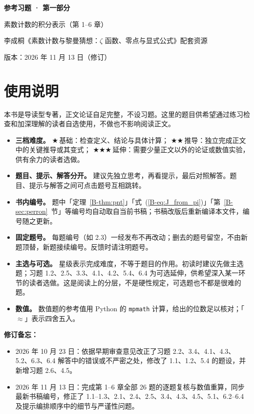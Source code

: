 \documentclass[11pt,a4paper]{article}
\newcommand{\bref}[1]{\ref*{B-#1}}
\newcommand{\lvI}{$\bigstar$\,基础}
\newcommand{\lvII}{$\bigstar\bigstar$\,推导}
\newcommand{\lvIII}{$\bigstar\bigstar\bigstar$\,延伸}
\newcommand{\versiondate}{2026 年 11 月 13 日（修订）}
\begin{document}
\begin{center}
{\LARGE\bfseries 参考习题 · 第一部分\par}
\vspace{0.6em}
{\large 素数计数的积分表示（第 1–6 章）\par}
\vspace{0.6em}
{\normalsize 李成桐《素数计数与黎曼猜想：$\zeta$ 函数、零点与显式公式》配套资源\par}
\vspace{0.3em}
{\small 版本：\versiondate\par}
\end{center}

\vspace{0.8em}
\section*{使用说明}

本书是导读型专著，正文论证自足完整，不设习题。这里的题目供希望通过练习检查和加深理解的读者自选使用，不做也不影响阅读正文。

\begin{itemize}
  \item \textbf{三档难度。}
    \lvI：检查定义、结论与具体计算；
    \lvII：独立完成正文中的关键推导或其变式；
    \lvIII：需要少量正文以外的论证或数值实验，供有余力的读者选做。
  \item \textbf{题目、提示、解答分开。}
    建议先独立思考，再看提示，最后对照解答。题目、提示与解答之间可点击题号互相跳转。
  \item \textbf{书内编号。}
    题中「定理~\bref{thm:pnt}」「式~(\bref{eq:J_from_pi})」「第~\bref{sec:perron}~节」等编号均自动取自当前书稿；书稿改版后重新编译本文件，编号随之更新。
  \item \textbf{固定题号。}
    每题编号（如 2.3）一经发布不再改动；删去的题号留空，不由新题顶替，新题接续编号。反馈时请注明题号。
  \item \textbf{主选与可选。}
    星级表示完成难度，不等于题目的作用。初读时建议先做主选题；习题 1.2、2.5、3.3、4.1、4.2、5.4、6.4 为可选延伸，供希望深入某一环节的读者选做。这是阅读上的分层，不是硬性规定，可选题也不都是很难的题。
  \item \textbf{数值。}
    数值题的参考值用 Python 的 \texttt{mpmath} 计算，给出的位数足以核对；「$\approx$」表示四舍五入。
\end{itemize}

\noindent\textbf{修订备忘：}
\begin{itemize}
  \item 2026 年 10 月 23 日：依据早期审查意见改正了习题 2.2、3.4、4.1、4.3、5.2、6.3、6.4 解答中的错误或不严密之处，修改了 1.1、1.2、5.4 的题设，并新增习题 2.6、4.5。
  \item 2026 年 11 月 13 日：完成第 1–6 章全部 26 题的逐题复核与数值重算，同步最新书稿编号，修正了 1.1–1.3、2.1、2.4、2.5、3.4、4.3、4.5、5.1、6.2–6.4 及提示编排顺序中的细节与严谨性问题。
\end{itemize}
\end{document}
